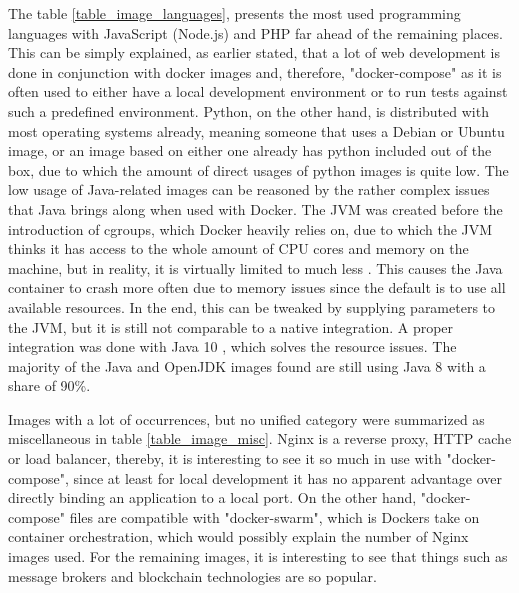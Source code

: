 The table \ref{table_image_languages}, presents the most used programming languages with JavaScript (Node.js) and PHP far ahead of the remaining places. This can be simply explained, as earlier stated, that a lot of web development is done in conjunction with docker images and, therefore, "docker-compose" as it is often used to either have a local development environment or to run tests against such a predefined environment. Python, on the other hand, is distributed with most operating systems already, meaning someone that uses a Debian or Ubuntu image, or an image based on either one already has python included out of the box, due to which the amount of direct usages of python images is quite low.
The low usage of Java-related images can be reasoned by the rather complex issues that Java brings along when used with Docker. The JVM was created before the introduction of cgroups, which Docker heavily relies on, due to which the JVM thinks it has access to the whole amount of CPU cores and memory on the machine, but in reality, it is virtually limited to much less \cite{javaDocker}. This causes the Java container to crash more often due to memory issues since the default is to use all available resources. In the end, this can be tweaked by supplying parameters to the JVM, but it is still not comparable to a native integration. A proper integration was done with Java 10 \cite{java10}, which solves the resource issues. The majority of the Java and OpenJDK images found are still using Java 8 with a share of 90\%.

Images with a lot of occurrences, but no unified category were summarized as miscellaneous in table \ref{table_image_misc}. Nginx is a reverse proxy, HTTP cache or load balancer, thereby, it is interesting to see it so much in use with "docker-compose", since at least for local development it has no apparent advantage over directly binding an application to a local port. On the other hand, "docker-compose" files are compatible with "docker-swarm", which is Dockers take on container orchestration, which would possibly explain the number of Nginx images used.
For the remaining images, it is interesting to see that things such as message brokers and blockchain technologies are so popular.


